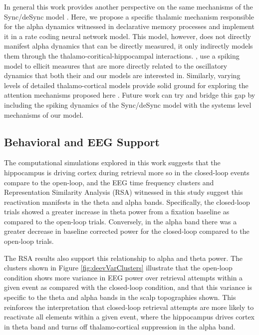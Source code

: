 \documentclass[11pt, titlepage, twoside]{article}
\begin{document}
In general this work provides another perspective on the same mechanisms of the Sync/deSync model \parencite{ParishHanslmayrBowman18}.  Here, we propose a specific thalamic mechanism responsible for the alpha dynamics witnessed in declarative memory processes and implement it in a rate coding neural network model.  This model, however, does not directly manifest alpha dynamics that can be directly measured, it only indirectly models them through the thalamo-coritical-hippocampal interactions.  \textcite{ParishHanslmayrBowman18}, use a spiking model to ellicit measures that are more directly related to the oscillatory dynamics that both their and our models are interested in.  Similarly, varying levels of detailed thalamo-cortical models provide solid ground for exploring the attention mechanisms proposed here
 \parencite{HindriksvanPutten13, BeckerKnockRitterEtAl15}.   Future work can try and bridge this gap by including the spiking dynamics of the Sync/deSync model with the systems level mechanisms of our model.

\subsection{Behavioral and EEG Support}
The computational simulations explored in this work suggests that the hippocampus is driving cortex during retrieval more so in the closed-loop events compare to the open-loop, and the EEG time frequency clusters and Representation Similarity Analysis (RSA) witnessed in this study suggest this reactivation manifests in the theta and alpha bands.   Specifically, the closed-loop trials showed a greater increase in theta power from a fixation baseline as compared to the open-loop trials.  Conversely, in the alpha band there was a greater decrease in baseline corrected power for the closed-loop compared to the open-loop trials.  

The RSA results also support this relationship to alpha and theta power.  The clusters shown in Figure \ref{fig:deevVarClusters} illustrate that the open-loop condition shows more variance in EEG power over retrieval attempts within a given event as compared with the closed-loop condition, and that this variance is specific to the theta and alpha bands in the scalp topographies shown.  This reinforces the interpretation that closed-loop retrieval attempts are more likely to reactivate all elements within a given event, where the hippocampus drives cortex in theta band and turns off thalamo-cortical suppression in the alpha band.  
\end{document}
